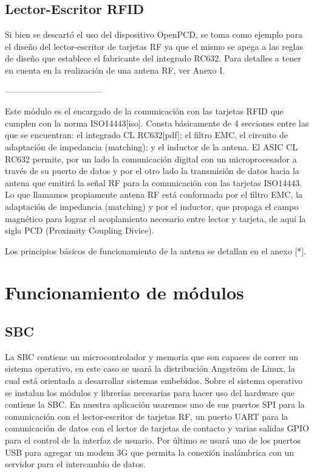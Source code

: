 \subsection{Lector-Escritor RFID}
Si bien se descartó el uso del dispositivo OpenPCD, se toma como ejemplo para el
diseño del lector-escritor de tarjetas RF ya que el mismo se apega a las reglas de
diseño que establece el fabricante del integrado RC632.
Para detalles a tener en cuenta en la realización de una antena RF, ver Anexo I.

\bigskip
-----------------------------------
\bigskip

	Este módulo es el encargado de la comunicación con las tarjetas RFID que cumplen con la norma ISO14443[iso]. Consta básicamente de 4 secciones entre las que se encuentran: el integrado CL RC632[pdf]; el filtro EMC, el circuito de adaptación de impedancia (matching); y el inductor de la antena. 
El ASIC CL RC632 permite, por un lado la comunicación digital con un microprocesador a través de su puerto de datos y por el otro lado la transmisión de datos hacia la antena que emitirá la señal RF para la comunicación con las tarjetas ISO14443. 
Lo que llamamos propiamente antena RF está conformada por el filtro EMC, la adaptación de impedancia (matching) y por el inductor, que propaga el campo magnético para lograr el acoplamiento necesario entre lector y tarjeta, de aquí la sigla PCD (Proximity Coupling Divice).

Los principios básicos de funcionamiento de la antena se detallan en el anexo [*].

\section{Funcionamiento de m\'odulos}

\subsection{SBC}
La SBC contiene un microcontrolador y memoria que son capaces de correr un
sistema operativo, en este caso se usará la distribución Angström de Linux, la cual
está orientada a desarrollar sistemas embebidos. Sobre el sistema operativo se
instalan los módulos y librerías necesarias para hacer uso del hardware que contiene
la SBC. En nuestra aplicación usaremos uno de sus puertos SPI para la comunicación
con el lector-escritor de tarjetas RF, un puerto UART para la comunicación de datos
con el lector de tarjetas de contacto y varias salidas GPIO para el control de la
interfaz de usuario. Por último se usará uno de los puertos USB para agregar un
modem 3G que permita la conexión inalámbrica con un servidor para el intercambio
de datos.

